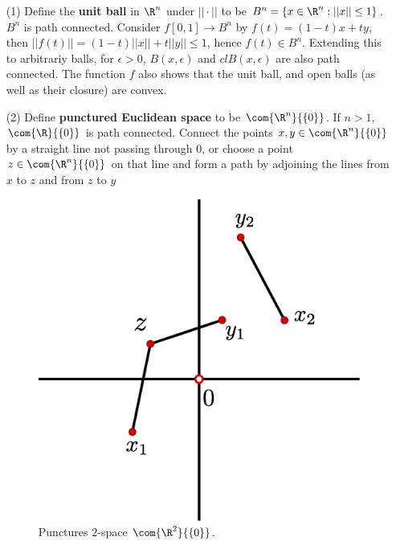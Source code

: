 \begin{example}
    \begin{enumerate}
        \item[(1)] Define the \textbf{unit ball} in $\R^n$ under  $||\cdot||$ to be  $B^n=\{x \in
            \R^n:||x|| \leq 1\}$. $B^n$ is path connected. Consider  $f[0,1] \rightarrow B^n$ by
            $f(t)=(1-t)x+ty$, then $||f(t)||=(1-t)||x||+t||y|| \leq 1$, hence $f(t) \in  B^n$.
            Extending this to arbitrariy balls, for $\epsilon>0$, $B(x,\epsilon)$ and
            $cl{B(x,\epsilon)}$ are also path connected. The function $f$ also shows that the unit
            ball, and open balls  (as well as their closure) are convex.

        \item[(2)] Define \textbf{punctured Euclidean space} to be $\com{\R^n}{\{0\}}$. If $n>1$,
        $\com{\R}{\{0\}}$ is path connected. Connect the points $x,y \in \com{\R^n}{\{0\}}$ by a
        straight line not passing through $0$, or choose a point $z \in \com{\R^n}{\{0\}}$ on that
        line and form a path by adjoining the lines from $x$ to  $z$ and from  $z$ to  $y$

        \begin{figure}[h]
            \centering
            \includegraphics[scale=0.5]{Figures/Chapter3/punctured_2_space.eps}
            \caption{Punctures $2$-space $\com{\R^2}{\{0\}}$.}
            \label{fig_3.1}
        \end{figure}


\end{enumerate}
\end{example}
